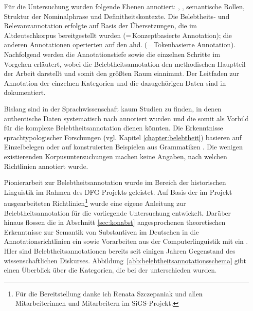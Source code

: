 Für die Untersuchung wurden folgende Ebenen  annotiert: , ,  semantische Rollen, Struktur der Nominalphrase und Definitheitskontexte. Die  Belebtheits- und Relevanzannotation erfolgte auf Basis der Übersetzungen, die im Altdeutschkorpus  bereitgestellt wurden (=\,Konzeptbasierte Annotation); die anderen Annotationen  operierten auf den ahd.   (=\,Tokenbasierte Annotation). Nachfolgend werden die Annotationstiefe  sowie die einzelnen Schritte im Vorgehen erläutert, wobei die Belebtheitsannotation den methodischen Hauptteil der Arbeit darstellt und somit den größten Raum einnimmt. Der Leitfaden zur Annotation  der einzelnen Kategorien und die dazugehörigen Daten sind in \textcite{HZKYL4_2020} dokumentiert. 


Bislang sind in der Sprachwissenschaft kaum Studien zu finden, in denen authentische Daten systematisch nach  annotiert  wurden und die somit als Vorbild für die komplexe  Belebtheitsannotation dienen könnten. Die Erkenntnisse sprachtypologischer Forschungen (vgl. Kapitel \ref{chapter:belebtheit}) basieren auf Einzelbelegen oder auf konstruierten Beispielen aus Grammatiken \parencite[z.B.][]{Comrie1989,Corbett2000,Aissen2003}. Die wenigen existierenden Korpusuntersuchungen  \parencite{Dahl1996,Yamamoto1999} machen keine Angaben, nach welchen Richtlinien annotiert  wurde.

Pionierarbeit zur Belebtheitsannotation wurde im Bereich der historischen Linguistik im Rahmen des DFG-Projekts  \parencite[vgl.][]{Szczepaniak2016} geleistet. Auf Basis der im Projekt ausgearbeiteten Richtlinien\footnote{Für die Bereitstellung danke ich Renata Szczepaniak und allen Mitarbeiterinnen und Mitarbeitern im SiGS-Projekt.} wurde eine eigene Anleitung zur Belebtheitsannotation für die vorliegende Untersuchung entwickelt. Darüber hinaus flossen die in Abschnitt \ref{sec:konabst} angesprochenen theoretischen Erkenntnisse zur Semantik von Substantiven  im Deutschen \parencite[u.a.][]{Ewald1992,Studler2011} in die Annotationsrichtlinien ein sowie  Vorarbeiten aus der Computerlinguistik mit ein \parencite[vgl.][]{Garretson2004,Zaenen2004,Ovrelid2009}. HIer sind Belebtheitsannotationen bereits seit einigen Jahren Gegenstand des wissenschaftlichen Diskurses. Abbildung~\ref{abb:belebtheitsannotationsschema} gibt einen Überblick über die Kategorien, die bei der  unterschieden wurden.


